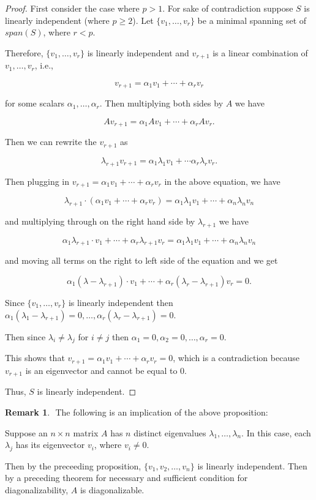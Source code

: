 \documentclass[12pt]{article}
\theoremstyle{definition}
\newtheorem*{remark}{Remark}
\begin{document}
\begin{proof}
First consider the case where $p > 1$. For sake of contradiction suppose $S$ is
linearly independent (where $p \geq 2$). Let $\{v_1, \ldots, v_r\}$ be a minimal
spanning set of $span(S)$, where $r < p$.

Therefore, $\{v_1, \ldots, v_r\}$ is linearly independent and $v_{r+1}$ is a linear
combination of $v_1, \ldots, v_r$, i.e., 

\[v_{r+1} = \alpha_1 v_1 + \cdots + \alpha_r v_r\]

for some scalars $\alpha_1, \ldots, \alpha_r$. Then multiplying both sides by $A$ we have

\[A v_{r + 1} = \alpha_1 A v_1 + \cdots + \alpha_r A v_r. \]

Then we can rewrite the $v_{r + 1}$ as 

\[ \lambda_{r + 1} v_{r + 1} = \alpha_1 \lambda_1 v_1 + \cdots \alpha_r \lambda_r v_r.\]

Then plugging in $v_{r + 1} = \alpha_1 v_1 + \cdots + \alpha_r v_r$ in the above equation,
we have

\[\lambda_{r + 1} \cdot (\alpha_1 v_1 + \cdots + \alpha_r v_r) = \alpha_1 \lambda_1 v_1 + \cdots +
\alpha_n \lambda_n v_n\]

and multiplying through on the right hand side by $\lambda_{r + 1}$ we have

\[
\alpha_1 \lambda_{r + 1} \cdot v_1 + \cdots + \alpha_r \lambda_{r + 1} v_r = \alpha_1
\lambda_1 v_1 + \cdots + \alpha_n \lambda_n v_n 
\]

and moving all terms on the right to left side of the equation and we get

\[ 
\alpha_1 (\lambda - \lambda_{r + 1}) \cdot v_1 + \cdots + 
\alpha_r (\lambda_r - \lambda_{r + 1}) v_r = 0.
\]

Since $\{v_1, \ldots, v_r\}$ is linearly independent then
$\alpha_1 (\lambda_1 - \lambda_{r + 1}) = 0, \ldots, \alpha_r (\lambda_r - \lambda_{r + 1}) = 0$.

Then since $\lambda_i \neq \lambda_j$ for $i \neq j$ then
$\alpha_1 = 0, \alpha_2 = 0, \ldots, \alpha_r = 0$.

This shows that $v_{r + 1} = \alpha_1 v_1 + \cdots + \alpha_r v_r = 0$, which is a 
contradiction because $v_{r + 1}$ is an eigenvector and cannot be equal to 0.

Thus, $S$ is linearly independent.
\end{proof}

\begin{remark} $ $
\noindent The following is an implication of the above proposition:

Suppose an $n \times n$ matrix $A$ has $n$ distinct eigenvalues $\lambda_1, \ldots, \lambda_n$.
In this case, each $\lambda_j$ has its eigenvector $v_i$, where $v_i \neq 0$.

Then by the preceeding proposition, $\{v_1, v_2, \ldots, v_n \}$ is linearly
independent. Then by a preceding theorem for necessary and sufficient condition
for diagonalizability, $A$ is diagonalizable.
\end{remark}
\end{document}
